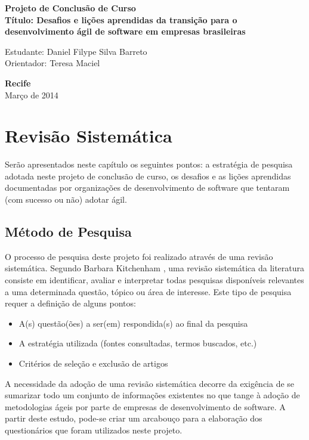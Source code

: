 \documentclass[a4paper,11pt]{article}
\begin{document}
\begin{center}
{\Large \bf  Projeto de Conclusão de Curso}\\[1cm]
{\Large \bf Título: Desafios e lições aprendidas da transição para o desenvolvimento ágil de software em empresas brasileiras} \\[3cm]
\end{center}
{\Large  Estudante: Daniel Filype Silva Barreto}\\[6mm]
{\Large  Orientador: Teresa Maciel}\\[6mm]
\vspace{3.0cm}
\begin{center}
{\large {\bf Recife}\\[6mm]
Março de 2014}
\end{center}
\newpage
\pagestyle {plain}
\setcounter{page}{0} 

\tableofcontents
\newpage

\listoftables
\newpage

\printnomenclature
\newpage

\listoffigures
\newpage

\section{Revisão Sistemática}
	Serão apresentados neste capítulo os seguintes pontos: a estratégia de pesquisa adotada neste projeto de conclusão de curso, os desafios e as lições aprendidas documentadas por organizações de desenvolvimento de software que tentaram (com sucesso ou não) adotar ágil.
	\subsection{Método de Pesquisa}
		O processo de pesquisa deste projeto foi realizado através de  uma revisão sistemática. Segundo Barbara Kitchenham \cite{Barbara04}, uma revisão sistemática da literatura consiste em identificar, avaliar e interpretar todas pesquisas disponíveis relevantes a uma determinada questão, tópico ou área de interesse. Este tipo de pesquisa requer a definição de alguns pontos:
		\begin{itemize}
			\item A(s) questão(ões) a ser(em) respondida(s) ao final da pesquisa
			\item A estratégia utilizada (fontes consultadas, termos buscados, etc.)
			\item Critérios de seleção e exclusão de artigos
		\end{itemize}
		A necessidade da adoção de uma revisão sistemática decorre da exigência de se sumarizar todo um conjunto de informações existentes no que tange à adoção de metodologias ágeis por parte de empresas de desenvolvimento de software. A partir deste estudo, pode-se criar um arcabouço para a elaboração dos questionários que foram utilizados neste projeto.
\end{document}
